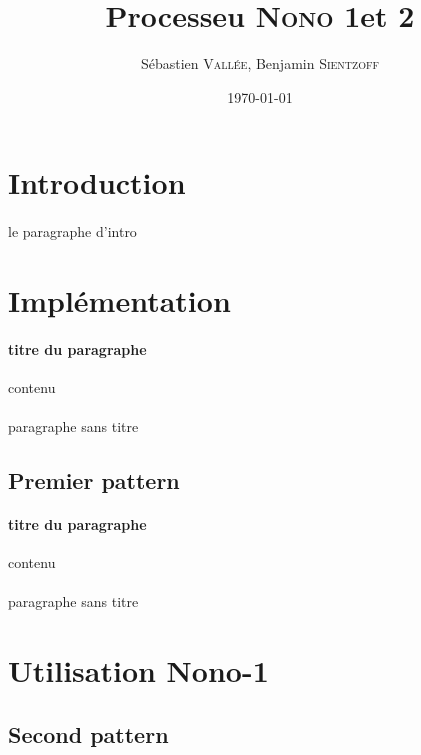 \documentclass[a4paper]{article}
\title{Processeu \textsc{Nono} 1et 2}
\author{Sébastien \textsc{Vallée}, Benjamin \textsc{Sientzoff}}
\date{\today}
\begin{document}
	\maketitle
	\vspace{5cm}
	\tableofcontents
	\newpage %
	
	\section*{Introduction}
	\paragraph{}{le paragraphe d'intro}
	
	\section{Implémentation}
	
		\paragraph{titre du paragraphe}{contenu}
		\paragraph{}{paragraphe sans titre}
		
		\subsection{Premier pattern}
		\paragraph{titre du paragraphe}{contenu}
		\paragraph{}{paragraphe sans titre}
		
	\section{Utilisation Nono-1}
		\subsection{Second pattern}
\end{document}
